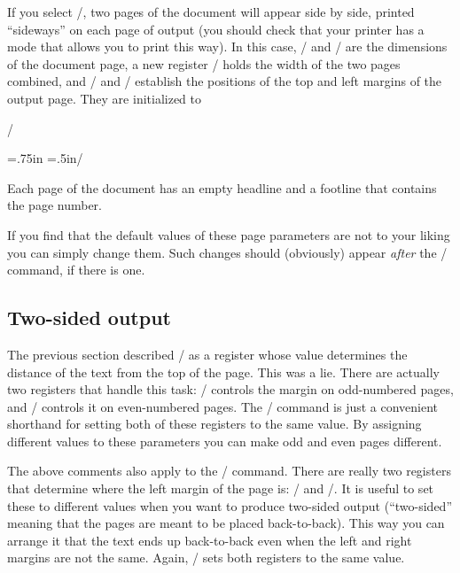 If you select \tts{}/, two pages of the document will appear
side by side, printed ``sideways'' on each page of output (you should check
that your printer has a mode that allows you to print this way).  In this case,
\tts\vsize/ and \tts\hsize/ are the dimensions of the document page, a new
register \tts\fullhsize/ holds the width of the two pages combined, and
\tts\topmargin/ and \tts\leftmargin/ establish the positions of the top and
left margins of the output page.  They are initialized to

\nobreak\smallskip

\tts\vsize=6.9in \hsize=4.75in \fullhsize=10in/ \par
\tts\topmargin=.75in \leftmargin=.5in/ \par

\smallskip

\noindent Each page of the document has an empty headline and a footline that
contains the page number.

If you find that the default values of these page parameters are not to your
liking you can simply change them.  Such changes should (obviously) appear {\it
after\/} the \tts\outputstyle/ command, if there is one.

{\sl\subsection{Two-sided output}}

The previous section described \tts\topmargin/ as a register whose value
determines the distance of the text from the top of the page.  This was a lie.
There are actually two registers that handle this task: \tts\oddtopmargin/
controls the margin on odd-numbered pages, and \tts\eventopmargin/ controls it
on even-numbered pages.  The \tts\topmargin/ command is just a convenient
shorthand for setting both of these registers to the same value.  By assigning
different values to these parameters you can make odd and even pages different.

The above comments also apply to the \tts\leftmargin/ command.  There are
really two registers that determine where the left margin of the page is:
\tts\oddleftmargin/ and \tts\evenleftmargin/.  It is useful to set these to
different values when you want to produce two-sided output (``two-sided''
meaning that the pages are meant to be placed back-to-back).  This way you can
arrange it that the text ends up back-to-back even when the left and right
margins are not the same.  Again, \tts\leftmargin/ sets both registers to the
same value.


